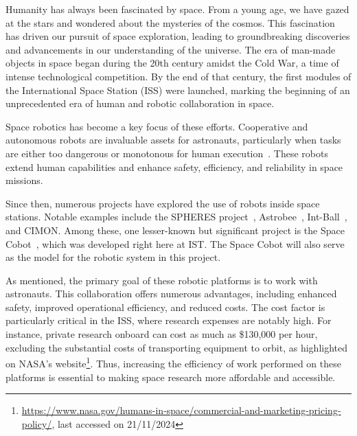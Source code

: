 Humanity has always been fascinated by space. From a young age, we have gazed at the stars and wondered about the mysteries of the cosmos. This fascination has driven our pursuit of space exploration, leading to groundbreaking discoveries and advancements in our understanding of the universe. The era of man-made objects in space began during the 20th century amidst the Cold War, a time of intense technological competition. By the end of that century, the first modules of the International Space Station (ISS) were launched, marking the beginning of an unprecedented era of human and robotic collaboration in space.

Space robotics has become a key focus of these efforts. Cooperative and autonomous robots are invaluable assets for astronauts, particularly when tasks are either too dangerous or monotonous for human execution~\cite{pedersen2003survey}. These robots extend human capabilities and enhance safety, efficiency, and reliability in space missions.

Since then, numerous projects have explored the use of robots inside space stations. Notable examples include the SPHERES project~\cite{miller2000spheres}, Astrobee~\cite{bualat2018astrobee}, Int-Ball~\cite{mitani2018crew}, and CIMON. Among these, one lesser-known but significant project is the Space Cobot~\cite{RoqueVentura2016spacecobot}, which was developed right here at IST. The Space Cobot will also serve as the model for the robotic system in this project.

As mentioned, the primary goal of these robotic platforms is to work with astronauts. This collaboration offers numerous advantages, including enhanced safety, improved operational efficiency, and reduced costs. The cost factor is particularly critical in the ISS, where research expenses are notably high. For instance, private research onboard can cost as much as \$130,000 per hour, excluding the substantial costs of transporting equipment to orbit, as highlighted on NASA's website\footnote{\url{https://www.nasa.gov/humans-in-space/commercial-and-marketing-pricing-policy/}, last accessed on 21/11/2024}. Thus, increasing the efficiency of work performed on these platforms is essential to making space research more affordable and accessible.
